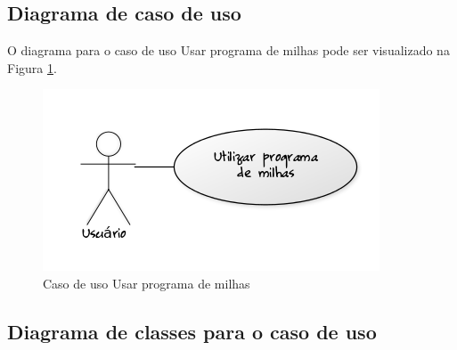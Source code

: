 \subsection{Diagrama de caso de uso}

O diagrama para o caso de uso Usar programa de milhas pode ser visualizado na Figura \ref{cdu:programaMilhas}.

\begin{figure}[!htb]
     \centering
     \includegraphics[scale=0.6]{diagramas/caso-de-uso/imagens/utilizarProgramaMilhas.png}
     \caption{Caso de uso Usar programa de milhas}
     \label{cdu:programaMilhas}
\end{figure}

\subsection{Diagrama de classes para o caso de uso}

